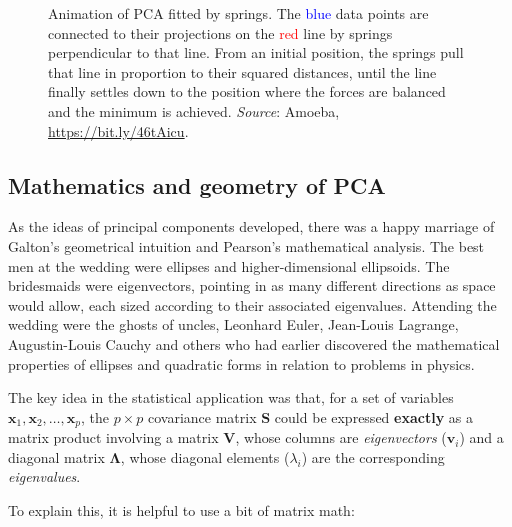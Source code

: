 \documentclass[
  letterpaper,
  10pt,
  krantz2]{krantz}
\begin{document}
\begin{figure}

\centering{

}

\caption{\label{fig-pca-springs}Animation of PCA fitted by springs. The
\textcolor{blue}{blue} data points are connected to their projections on
the \textcolor{red}{red} line by springs perpendicular to that line.
From an initial position, the springs pull that line in proportion to
their squared distances, until the line finally settles down to the
position where the forces are balanced and the minimum is achieved.
\emph{Source}: Amoeba, \url{https://bit.ly/46tAicu}.}

\end{figure}%

\subsection{Mathematics and geometry of
PCA}\label{mathematics-and-geometry-of-pca}

As the ideas of principal components developed, there was a happy
marriage of Galton's geometrical intuition and Pearson's mathematical
analysis. The best men at the wedding were ellipses and
higher-dimensional ellipsoids. The bridesmaids were eigenvectors,
pointing in as many different directions as space would allow, each
sized according to their associated eigenvalues. Attending the wedding
were the ghosts of uncles, Leonhard Euler, Jean-Louis Lagrange,
Augustin-Louis Cauchy and others who had earlier discovered the
mathematical properties of ellipses and quadratic forms in relation to
problems in physics.

The key idea in the statistical application was that, for a set of
variables \(\mathbf{x}_1, \mathbf{x}_2, \dots, \mathbf{x}_p\), the
\(p \times p\) covariance matrix \(\mathbf{S}\) could be expressed
\textbf{exactly} as a matrix product involving a matrix \(\mathbf{V}\),
whose columns are \emph{eigenvectors} (\(\mathbf{v}_i\)) and a diagonal
matrix \(\mathbf{\Lambda}\), whose diagonal elements (\(\lambda_i\)) are
the corresponding \emph{eigenvalues}.

To explain this, it is helpful to use a bit of matrix math:
\end{document}
